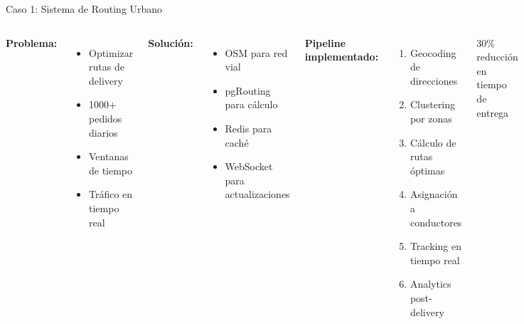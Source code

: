\documentclass[10pt,aspectratio=169]{beamer}
\newcommand{\conceptbox}[2]{
\begin{tcolorbox}[colframe=usachblue,colback=blue!5,title=#1,fonttitle=\bfseries]
#2
\end{tcolorbox}
}
\begin{document}
\begin{frame}{Caso 1: Sistema de Routing Urbano}
    \begin{columns}[T]
        \textbf{Problema:}
        \begin{itemize}
            \item Optimizar rutas de delivery
            \item 1000+ pedidos diarios
            \item Ventanas de tiempo
            \item Tráfico en tiempo real
        \end{itemize}
        
        \vspace{0.3cm}
        \textbf{Solución:}
        \begin{itemize}
            \item OSM para red vial
            \item pgRouting para cálculo
            \item Redis para caché
            \item WebSocket para actualizaciones
        \end{itemize}
        
        \textbf{Pipeline implementado:}
        \begin{enumerate}
            \item Geocoding de direcciones
            \item Clustering por zonas
            \item Cálculo de rutas óptimas
            \item Asignación a conductores
            \item Tracking en tiempo real
            \item Analytics post-delivery
        \end{enumerate}
        
        \vspace{0.3cm}
        \conceptbox{Resultado}{
            30\% reducción en tiempo de entrega
        }
    \end{columns}
\end{frame}
\end{document}
